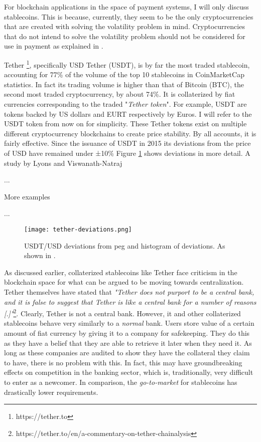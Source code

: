 For blockchain applications in the space of payment systems, I will
only discuss stablecoins. This is because, currently, they seem to be
the only cryptocurrencies that are created with solving the volatility
problem in mind. Cryptocurrencies that do not intend to solve the
volatility problem should not be considered for use in payment as
explained in \cite{yermackBitcoin}.

Tether \footnote{https://tether.to}, specifically USD Tether (USDT),
is by far the most traded stablecoin, accounting for 77\% of the
volume of the top 10 stablecoins in CoinMarketCap statistics. In fact
its trading volume is higher than that of Bitcoin (BTC), the second
most traded cryptocurrency, by about 74\%. It is collaterized by fiat
currencies corresponding to the traded "\textit{Tether token}". For
example, USDT are tokens backed by US dollars and EURT respectively by
Euros. I will refer to the USDT token from now on for simplicity.
These Tether tokens exist on multiple different cryptocurrency
blockchains to create price stability. By all accounts, it is fairly
effective. Since the issuance of USDT in 2015 its deviations from the
price of USD have remained under ±10\% Figure
\ref{fig:tether-deviations} shows deviations in more detail. A study
by Lyons and Viswanath-Natraj \cite{lyonsStable} 

...

More examples

...

\begin{figure}
  \texttt{[image: tether-deviations.png]}
  \caption{USDT/USD deviations from peg and histogram of deviations.
  As shown in \cite{lyonsStable}.}
  \label{fig:tether-deviations}
\end{figure}

As discussed earlier, collaterized stablecoins like Tether face
criticism in the blockchain space for what can be argued to be moving
towards centralization. Tether themselves have stated that
\textit{"Tether does not purport to be a central bank, and it is false
to suggest that Tether is like a central bank for a number of reasons
[.]"}\footnote{https://tether.to/en/a-commentary-on-tether-chainalysis}.
Clearly, Tether is not a central bank. However, it and other
collaterized stablecoins behave very similarly to a \textit{normal}
bank. Users store value of a certain amount of fiat currency by giving
it to a company for safekeeping. They do this as they have a belief
that they are able to retrieve it later when they need it. As long as
these companies are audited to show they have the collateral they
claim to have, there is no problem with this. In fact, this may have
groundbreaking effects on competition in the banking sector, which is,
traditionally, very difficult to enter as a newcomer. In comparison,
the \textit{go-to-market} for stablecoins has drastically lower
requirements.


